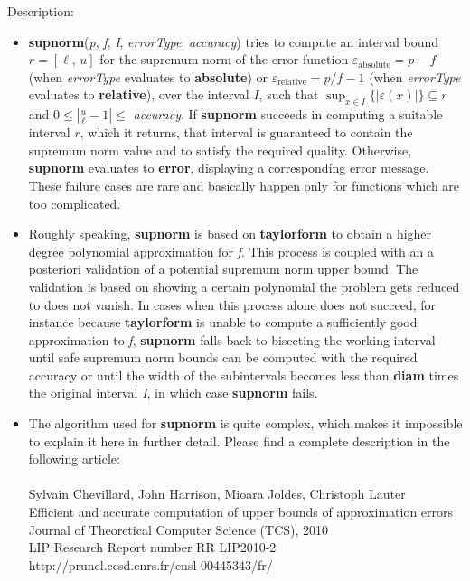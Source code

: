 \noindent Description: \begin{itemize}

\item \textbf{supnorm}(\emph{p}, \emph{f}, \emph{I}, \emph{errorType}, \emph{accuracy}) tries to compute an
   interval bound $r = [\ell,\,u]$ for the supremum norm of the error function
   $\varepsilon_{\textrm{absolute}}=p-f$ (when \emph{errorType} evaluates to \textbf{absolute})
   or $\varepsilon_{\textrm{relative}}=p/f-1$ (when \emph{errorType} evaluates to \textbf{relative}),
   over the interval $I$, such that $\sup_{x \in I} \{|\varepsilon(x)|\}\subseteq r$
   and $0 \le \left \vert\frac{u}{\ell} - 1 \right \vert \le$ \emph{accuracy}. If \textbf{supnorm} succeeds in computing a suitable
   interval $r$, which it returns, that interval is guaranteed to contain the
   supremum norm value and to satisfy the required quality. Otherwise, \textbf{supnorm}
   evaluates to \textbf{error}, displaying a corresponding error message. These failure
   cases are rare and basically happen only for functions which are too
   complicated.

\item Roughly speaking, \textbf{supnorm} is based on \textbf{taylorform} to obtain a higher
   degree polynomial approximation for \emph{f}. This process is coupled with
   an a posteriori validation of a potential supremum norm upper bound. 
   The validation is based on showing a certain polynomial the problem gets
   reduced to does not vanish. In cases when this process alone does not 
   succeed, for instance because \textbf{taylorform} is unable to compute a 
   sufficiently good approximation to \emph{f}, \textbf{supnorm} falls back to
   bisecting the working interval until safe supremum norm bounds can be
   computed with the required accuracy or until the width of the
   subintervals becomes less than \textbf{diam} times the original interval \emph{I}, 
   in which case \textbf{supnorm} fails.

\item The algorithm used for \textbf{supnorm} is quite complex, which makes it impossible 
   to explain it here in further detail. 
   Please find a complete description in the following article:\\
   ~\\
      Sylvain Chevillard, John Harrison, Mioara Joldes, Christoph Lauter\\
      Efficient and accurate computation of upper bounds of approximation errors\\
      Journal of Theoretical Computer Science (TCS), 2010\\
      LIP Research Report number RR LIP2010-2\\
      http://prunel.ccsd.cnrs.fr/ensl-00445343/fr/\\


\end{itemize}
